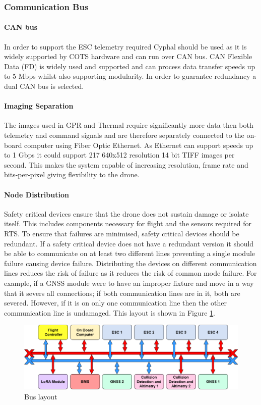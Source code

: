 \subsubsection{Communication Bus}
\paragraph{\gls{CAN} bus}
In order to support the \gls{ESC} telemetry required Cyphal should be used as it is widely supported by \gls{COTS} hardware and can run over \gls{CAN} bus. CAN Flexible Data (FD) is widely used and supported and can process data transfer speeds up to 5 Mbps whilst also supporting modularity. In order to guarantee redundancy a dual \gls{CAN} bus is selected.
\paragraph{Imaging Separation}
The images used in GPR and Thermal require significantly more data then both telemetry and command signals and are therefore separately connected to the on-board computer using Fiber Optic Ethernet. As Ethernet can support speeds up to 1 Gbps it could support 217 640x512 resolution 14 bit TIFF images per second. This makes the system capable of increasing resolution, frame rate and bits-per-pixel giving flexibility to the drone.
\paragraph{Node Distribution}
Safety critical devices ensure that the drone does not sustain damage or isolate itself. This includes components necessary for flight and the sensors required for \gls{RTS}. To ensure that failures are minimised, safety critical devices should be redundant. If a safety critical device does not have a redundant version it should be able to communicate on at least two different lines preventing a single module failure causing device failure. Distributing the devices on different communication lines reduces the risk of failure as it reduces the risk of common mode failure. For example, if a \gls{GNSS} module were to have an improper fixture and move in a way that it severs all connections; if both communication lines are in it, both are severed. However, if it is on only one communication line then the other communication line is undamaged. This layout is shown in Figure \ref{fig:CAN_bus}. 
 \begin{figure}[h!]
 \centering
  \includegraphics[width=1\textwidth]{figs/Thomas/Intra Communication/CAN bus.png}
 \caption{Bus layout}
 \label{fig:CAN_bus}
 \end{figure}
